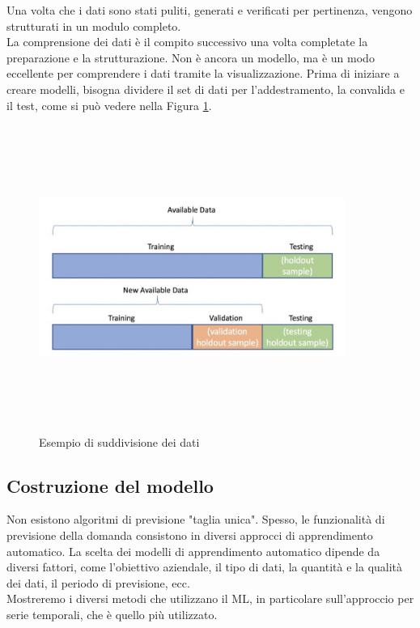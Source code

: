 \documentclass[12pt,a4paper]{report}
\begin{document}
Una volta che i dati sono stati puliti, generati e verificati per pertinenza, vengono strutturati in un modulo completo.\\
La comprensione dei dati è il compito successivo una volta completate la preparazione e la strutturazione. Non è ancora un modello, ma è un modo eccellente per comprendere i dati tramite la visualizzazione. 
Prima di iniziare a creare modelli, bisogna dividere il set di dati per l'addestramento, la convalida e il test, come si può vedere nella Figura \ref{fig:data-split-forecast}.

\begin{figure}[h!]
    \begin{center}
        \includegraphics[width=10cm,height=10cm,keepaspectratio]{Data_forecast}
    \end{center}
    \caption{Esempio di suddivisione dei dati}
    \label{fig:data-split-forecast}
\end{figure}


\subsection{Costruzione del modello}
Non esistono algoritmi di previsione "taglia unica". Spesso, le funzionalità di previsione della domanda consistono in diversi approcci di apprendimento automatico. La scelta dei modelli di apprendimento automatico dipende da diversi fattori, come l'obiettivo aziendale, il tipo di dati, la quantità e la qualità dei dati, il periodo di previsione, ecc.\\
Mostreremo i diversi metodi che utilizzano il ML, in particolare sull'approccio per serie temporali, che è quello più utilizzato.
\end{document}
